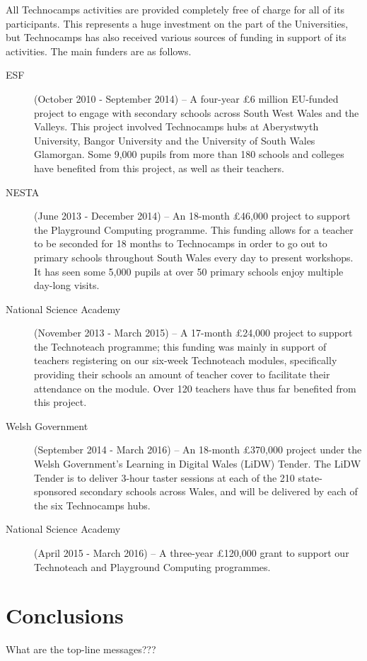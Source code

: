 \documentclass{sig-alternate}
\begin{document}
All Technocamps activities are provided completely free of charge
for all of its participants. This represents a huge investment
on the part of the Universities, but Technocamps has also received
various sources of funding in support of its activities.
The main funders are as follows.
\begin{description}
\item[ESF] (October 2010 - September 2014) --
A four-year \pounds 6 million EU-funded project to engage with secondary schools across South West Wales and the Valleys. This project involved Technocamps hubs at Aberystwyth University, Bangor University and the University of South Wales Glamorgan. Some 9,000 pupils from more than 180 schools and colleges have benefited from this project, as well as their teachers.
\item[NESTA] (June 2013 - December 2014) --
An 18-month \pounds 46,000 project to support the Playground Computing programme. This funding allows for a teacher to be seconded for 18 months to Technocamps in order to go out to primary schools throughout South Wales every day to present workshops. It has seen some 5,000 pupils at over 50 primary schools enjoy multiple day-long visits.
\item[National Science Academy] (November 2013 - March 2015) --
A 17-month \pounds 24,000 project to support the Technoteach programme; this funding was mainly in support of teachers registering on our six-week Technoteach modules, specifically providing their schools an amount of teacher cover to facilitate their attendance on the module. Over 120 teachers have thus far benefited from this project.
\item[Welsh Government] (September 2014 - March 2016) --
An 18-month \pounds 370,000 project under the Welsh Government's Learning in Digital Wales (LiDW) Tender. The LiDW Tender is to deliver 3-hour taster sessions at each of the 210 state-sponsored secondary schools across Wales, and will be delivered by each of the six Technocamps hubs.
\item[National Science Academy] (April 2015 - March 2016) --
A three-year \pounds 120,000 grant to support our Technoteach and
Playground Computing programmes.
\end{description}

\section{Conclusions}
What are the top-line messages???
\end{document}
